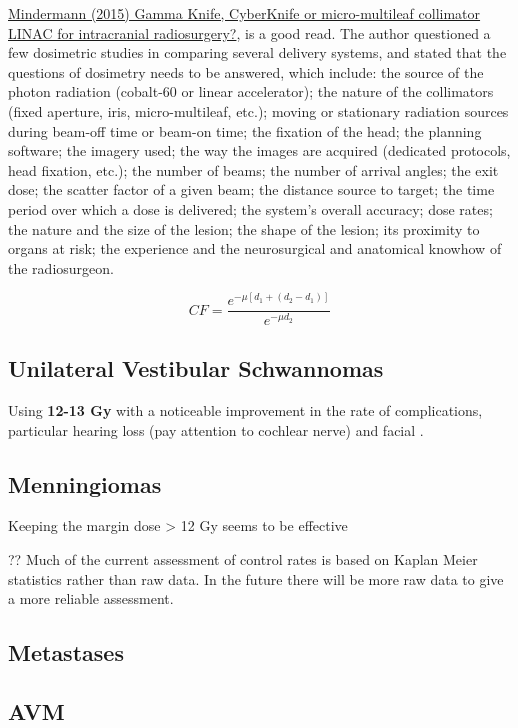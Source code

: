 \documentclass[]{book}
\theoremstyle{definition}
\theoremstyle{definition}
\theoremstyle{definition}
\theoremstyle{remark}
\begin{document}
\href{https://link.springer.com/article/10.1007/s00701-014-2275-6}{Mindermann
(2015) Gamma Knife, CyberKnife or micro-multileaf collimator LINAC for
intracranial radiosurgery?}, is a good read. The author questioned a few
dosimetric studies in comparing several delivery systems, and stated
that the questions of dosimetry needs to be answered, which include: the
source of the photon radiation (cobalt-60 or linear accelerator); the
nature of the collimators (fixed aperture, iris, micro-multileaf, etc.);
moving or stationary radiation sources during beam-off time or beam-on
time; the fixation of the head; the planning software; the imagery used;
the way the images are acquired (dedicated protocols, head fixation,
etc.); the number of beams; the number of arrival angles; the exit dose;
the scatter factor of a given beam; the distance source to target; the
time period over which a dose is delivered; the system's overall
accuracy; dose rates; the nature and the size of the lesion; the shape
of the lesion; its proximity to organs at risk; the experience and the
neurosurgical and anatomical knowhow of the radiosurgeon.

\[CF=\frac{e^{-\mu[d_1+(d_2-d_1 )]}} {e^{-\mu d_2}} \]

\subsection{Unilateral Vestibular
Schwannomas}\label{unilateral-vestibular-schwannomas}

Using \textbf{12-13 Gy} with a noticeable improvement in the rate of
complications, particular hearing loss (pay attention to cochlear nerve)
and facial .

\subsection{Menningiomas}\label{menningiomas}

Keeping the margin dose \textgreater{} 12 Gy seems to be effective

?? Much of the current assessment of control rates is based on Kaplan
Meier statistics rather than raw data. In the future there will be more
raw data to give a more reliable assessment.

\subsection{Metastases}\label{metastases}

\subsection{AVM}\label{avm}
\end{document}
